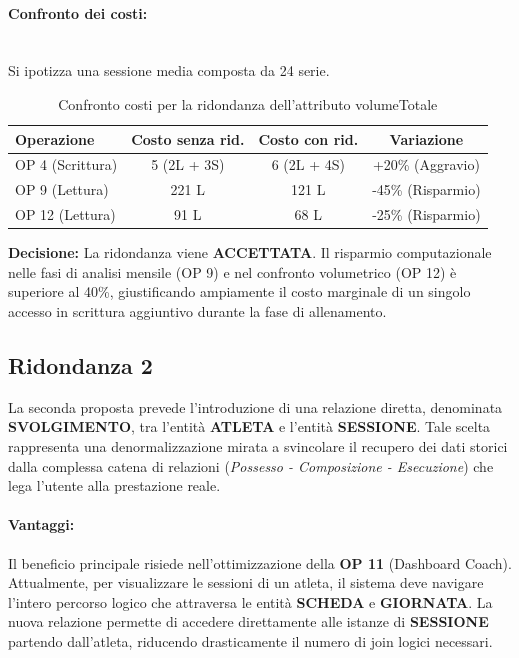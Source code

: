 \documentclass[12pt]{report}
\begin{document}
\paragraph{Confronto dei costi:} \mbox{} \\
Si ipotizza una sessione media composta da 24 serie.
\begin{table}[H]
\centering
\begin{tabular}{|l|c|c|c|}
\hline
\textbf{Operazione} & \textbf{Costo senza rid.} & \textbf{Costo con rid.} & \textbf{Variazione} \\ \hline
OP 4 (Scrittura)    & 5 (2L + 3S)               & 6 (2L + 4S)             & +20\% (Aggravio)    \\ \hline
OP 9 (Lettura)      & 221 L                     & 121 L                   & -45\% (Risparmio)   \\ \hline
OP 12 (Lettura)     & 91 L                      & 68 L                    & -25\% (Risparmio)   \\ \hline
\end{tabular}
\caption{Confronto costi per la ridondanza dell'attributo volumeTotale}
\end{table}

\textbf{Decisione:} La ridondanza viene \textbf{ACCETTATA}. Il risparmio computazionale nelle fasi di analisi mensile (OP 9) e nel confronto volumetrico (OP 12) è superiore al 40\%, giustificando ampiamente il costo marginale di un singolo accesso in scrittura aggiuntivo durante la fase di allenamento.

\subsection{Ridondanza 2}
La seconda proposta prevede l'introduzione di una relazione diretta, denominata \textbf{SVOLGIMENTO}, tra l'entità \textbf{ATLETA} e l'entità \textbf{SESSIONE}. Tale scelta rappresenta una denormalizzazione mirata a svincolare il recupero dei dati storici dalla complessa catena di relazioni (\textit{Possesso - Composizione - Esecuzione}) che lega l'utente alla prestazione reale.

\paragraph{Vantaggi:}
Il beneficio principale risiede nell'ottimizzazione della \textbf{OP 11} (Dashboard Coach). Attualmente, per visualizzare le sessioni di un atleta, il sistema deve navigare l'intero percorso logico che attraversa le entità \textbf{SCHEDA} e \textbf{GIORNATA}. La nuova relazione permette di accedere direttamente alle istanze di \textbf{SESSIONE} partendo dall'atleta, riducendo drasticamente il numero di join logici necessari.
\end{document}
